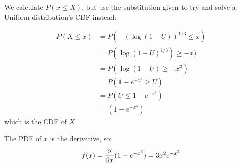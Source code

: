 \documentclass[11.5pt]{article}
\begin{document}
\begin{solution}{0.5} 
We calculate $P(x \leq X)$, but use the substitution given to try and solve a Uniform distribution's CDF instead: 

\begin{align*}
P(X \leq x) &= P(-(\log(1-U))^{1/3} \leq x)\\
 & = P(\log(1-U)^{1/3}) \geq -x) \\ 
&= P(\log(1-U) \geq -x^3)  \\ 
&= P(1 - e^{-x^3} \geq U) \\
&= P(U \leq 1 - e^{-x^3})\\
&= \boxed{(1 - e^{-x^3})}
\end{align*}
which is the CDF of $X$. 

The PDF of $x$ is the derivative, so: $$ f(x) = \pder[]{x} (1 - e^{-x^3}) = 3x^2 e^{-x^3}$$

\end{solution}

\end{document}
